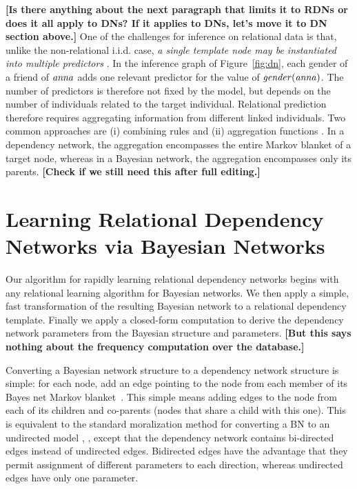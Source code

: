 \documentclass[runningheads,a4paper]{llncs}
\newcommand{\fixneeded}[1]{\textbf{[\footnotesize #1]}}
\newcommand{\iid}{i.i.d.}
\begin{document}
\fixneeded{Is there anything about the next paragraph that limits it to RDNs or does it all apply to DNs? If it applies to DNs, let's move it to DN section above.}
One of the challenges for inference on relational data is that, unlike the non-relational \iid{} case, {\em a single template node may be instantiated into multiple predictors} \cite{Natarajan2008}. In the inference graph of Figure~\ref{fig:dn}, each gender of a friend of $\it{anna}$ adds one relevant predictor for the value of $\it{gender}(anna)$. The number of predictors is therefore not fixed by the model, but depends on the number of individuals related to the target individual. Relational prediction therefore requires aggregating information from different linked individuals. Two common approaches are (i) combining rules \cite{Kersting2007} and (ii) aggregation functions \cite{Getoor2007c}. In a dependency network, the aggregation encompasses the entire Markov blanket of a target node, whereas in a Bayesian network, the aggregation encompasses only its parents.
\fixneeded{Check if we still need this after full editing.}

\section{Learning Relational Dependency Networks via Bayesian Networks}

Our algorithm for rapidly learning relational dependency networks
begins with any relational learning algorithm for Bayesian networks. We then apply a simple, fast transformation of the resulting Bayesian network to a relational dependency template. Finally we apply a closed-form computation to derive the dependency network parameters from the Bayesian structure and parameters. \fixneeded{But this says nothing about the frequency computation over the database.}

Converting a Bayesian network structure to a dependency network structure is simple: for each node, add an edge pointing to the node from each member of its Bayes net Markov blanket~\cite{Heckerman2000}.  This simple means adding edges to the node from each of its children and co-parents (nodes that share a child with this one). This is equivalent to the standard moralization  method for converting a BN to an undirected model \cite[12.5.3]{Domingos2007}, \cite{Lauritzen1996}, except that the dependency network contains bi-directed edges instead of undirected edges. Bidirected edges have the advantage that they permit  assignment of different parameters to each direction, whereas undirected edges have only one parameter.
 
\end{document}
